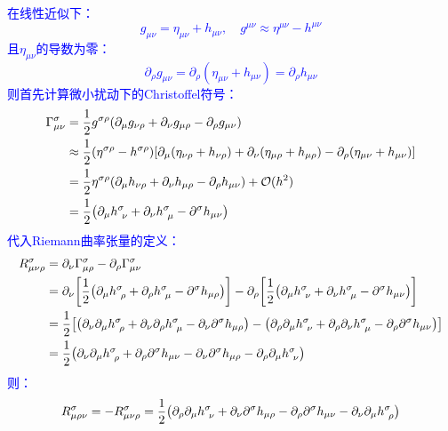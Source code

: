 \documentclass[a4paper]{article}
\begin{document}
\begin{enumerate}
    \textcolor{blue}{
    在线性近似下：
    \[
        g_{\mu\nu} = \eta_{\mu\nu} + h_{\mu\nu},\quad g^{\mu\nu} \approx \eta^{\mu\nu} - h^{\mu\nu}
    \]
    且$\eta_{\mu\nu}$的导数为零：
    \[
        \partial_\rho g_{\mu\nu} = \partial_\rho (\eta_{\mu\nu} + h_{\mu\nu}) = \partial_\rho h_{\mu\nu}
    \]
    则首先计算微小扰动下的Christoffel符号：
    \begin{align*}
        \Gamma^\sigma_{\mu\nu}
        &= \frac{1}{2} g^{\sigma\rho} (\partial_\mu g_{\nu\rho} + \partial_\nu g_{\mu\rho} - \partial_\rho g_{\mu\nu}) \\
        &\approx \frac{1}{2} (\eta^{\sigma\rho} - h^{\sigma\rho}) \qty[\partial_\mu (\eta_{\nu\rho} + h_{\nu\rho}) + \partial_\nu (\eta_{\mu\rho} + h_{\mu\rho}) - \partial_\rho (\eta_{\mu\nu} + h_{\mu\nu})] \\
        &= \frac{1}{2} \eta^{\sigma\rho} (\partial_\mu h_{\nu\rho} + \partial_\nu h_{\mu\rho} - \partial_\rho h_{\mu\nu}) + \mathcal{O}(h^2) \\
        &= \frac{1}{2} \qty(\partial_\mu h^\sigma_{\ \nu} + \partial_\nu h^\sigma_{\ \mu} - \partial^\sigma h_{\mu\nu})
    \end{align*}
    代入Riemann曲率张量的定义：
    \begin{align*}
        R^\sigma_{\mu\nu\rho}
        &= \partial_\nu \Gamma^\sigma_{\mu\rho} - \partial_\rho \Gamma^\sigma_{\mu\nu} \\
        &= \partial_\nu \qty[\frac{1}{2} \qty(\partial_\mu h^\sigma_{\ \rho} + \partial_\rho h^\sigma_{\ \mu} - \partial^\sigma h_{\mu\rho})] - \partial_\rho \qty[\frac{1}{2} \qty(\partial_\mu h^\sigma_{\ \nu} + \partial_\nu h^\sigma_{\ \mu} - \partial^\sigma h_{\mu\nu})] \\
        &= \frac{1}{2} \qty[\qty(\partial_\nu \partial_\mu h^\sigma_{\ \rho} + \partial_\nu \partial_\rho h^\sigma_{\ \mu} - \partial_\nu \partial^\sigma h_{\mu\rho}) - \qty(\partial_\rho \partial_\mu h^\sigma_{\ \nu} + \partial_\rho \partial_\nu h^\sigma_{\ \mu} - \partial_\rho \partial^\sigma h_{\mu\nu})] \\
        &= \frac{1}{2}\qty(\partial_\nu \partial_\mu h^\sigma_{\ \rho} + \partial_\rho \partial^\sigma h_{\mu\nu} - \partial_\nu \partial^\sigma h_{\mu\rho} - \partial_\rho \partial_\mu h^\sigma_{\ \nu})
    \end{align*}
    则：
    \[
        R^\sigma_{\mu\rho\nu} = -R^\sigma_{\mu\nu\rho} = \frac{1}{2} \qty(\partial_\rho \partial_\mu h^\sigma_{\ \nu} + \partial_\nu \partial^\sigma h_{\mu\rho} - \partial_\rho \partial^\sigma h_{\mu\nu} - \partial_\nu \partial_\mu h^\sigma_{\ \rho})
\]}
\end{enumerate}
\end{document}
